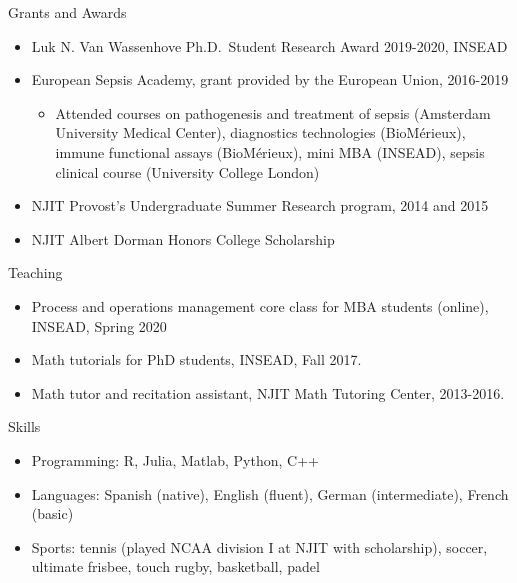 \documentclass{resume}
\begin{document}
\begin{rSection}{Grants and Awards}

\begin{itemize}
\item Luk N. Van Wassenhove Ph.D.\ Student Research Award 2019-2020, INSEAD
\item European Sepsis Academy, grant provided by the European Union, 2016-2019
\begin{itemize}
  \item Attended courses on pathogenesis and treatment of sepsis (Amsterdam University Medical Center), diagnostics technologies (BioM\'erieux), immune functional assays (BioM\'erieux), mini MBA (INSEAD), sepsis clinical course (University College London)
\end{itemize}
\item NJIT Provost’s Undergraduate Summer Research program, 2014 and 2015
\item NJIT Albert Dorman Honors College Scholarship
\end{itemize}

\begin{rSection}{Teaching}
\begin{itemize}
\item Process and operations management core class for MBA students (online), INSEAD, Spring 2020
\item Math tutorials for PhD students, INSEAD, Fall 2017.
\item Math tutor and recitation assistant, NJIT Math Tutoring Center, 2013-2016.
\end{itemize}

\end{rSection}


\end{rSection}

\begin{rSection}{Skills}
\begin{itemize}
\item Programming: R, Julia, Matlab, Python, C++
\item Languages: Spanish (native), English (fluent), German (intermediate), French (basic)
\item Sports: tennis (played NCAA division I at NJIT with scholarship), soccer, ultimate frisbee, touch rugby, basketball, padel
\end{itemize}

\end{rSection}
 
\end{document}

